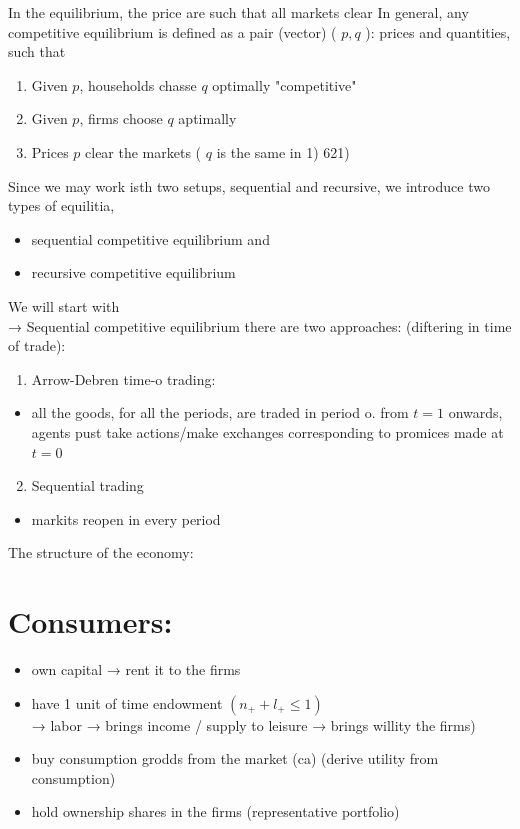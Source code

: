 \documentclass[10pt]{article}
\begin{document}
In the equilibrium, the price are such that all markets clear In general, any competitive equilibrium is defined as a pair (vector) ( $p, q$ ): prices and quantities, such that

\begin{enumerate}
  \item Given $p$, households chasse $q$ optimally "competitive"
  \item Given $p$, firms choose $q$ aptimally
  \item Prices $p$ clear the markets ( $q$ is the same in 1) 621)
\end{enumerate}

Since we may work isth two setups, sequential and recursive, we introduce two types of equilitia,

\begin{itemize}
  \item sequential competitive equilibrium and
  \item recursive competitive equilibrium
\end{itemize}

We will start with\\
→ Sequential competitive equilibrium there are two approaches: (diftering in time of trade):

\begin{enumerate}
  \item Arrow-Debren time-o trading:
\end{enumerate}

\begin{itemize}
  \item all the goods, for all the periods, are traded in period o. from $t=1$ onwards, agents pust take actions/make exchanges corresponding to promices made at $t=0$
\end{itemize}

\begin{enumerate}
  \setcounter{enumi}{1}
  \item Sequential trading
\end{enumerate}

\begin{itemize}
  \item markits reopen in every period
\end{itemize}

The structure of the economy:

\section*{Consumers:}
\begin{itemize}
  \item own capital → rent it to the firms
  \item have 1 unit of time endowment $\left(n_{+}+l_{+} \leq 1\right)$\\
→ labor → brings income / supply to leisure → brings willity the firms)
  \item buy consumption grodds from the market (ca) (derive utility from consumption)
  \item hold ownership shares in the firms (representative portfolio)
\end{itemize}
\end{document}
